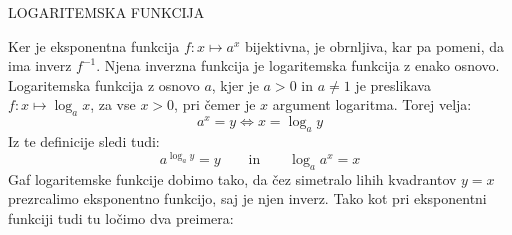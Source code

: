 \begin{center}
LOGARITEMSKA FUNKCIJA
\end{center}

Ker je eksponentna funkcija  $f: x \mapsto a^x$ bijektivna, je obrnljiva, kar pa pomeni, da ima inverz $f^{-1}$. Njena inverzna funkcija je logaritemska funkcija z enako osnovo. Logaritemska funkcija z osnovo $a$, kjer je $a > 0$ in $a \neq 1$ je preslikava $f: x \mapsto \log_a{x}$, za vse $x > 0$, pri čemer je $x$ argument logaritma. Torej velja:
\begin{equation*}
a^x=y \Leftrightarrow x=\log_a{y}
\end{equation*}
%
Iz te definicije sledi tudi: 
\begin{equation*}
a^{\log_a{y}} = y \qquad \text{in} \qquad \log_a{a^x} = x
\end{equation*}
%
Gaf logaritemske funkcije dobimo tako, da čez simetralo lihih kvadrantov $y=x$ prezrcalimo eksponentno funkcijo, saj je njen inverz. Tako kot pri eksponentni funkciji tudi tu ločimo dva preimera:
